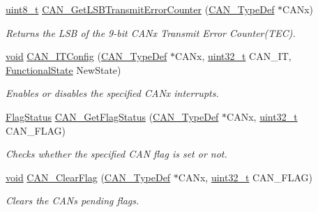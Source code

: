 \begin{DoxyCompactItemize}
\hyperlink{_p_e___types_8h_aba7bc1797add20fe3efdf37ced1182c5}{uint8\+\_\+t} \hyperlink{group___c_a_n___private___functions_ga85ee0c35bf7ca15d4e4c862eef534843}{C\+A\+N\+\_\+\+Get\+L\+S\+B\+Transmit\+Error\+Counter} (\hyperlink{struct_c_a_n___type_def}{C\+A\+N\+\_\+\+Type\+Def} $\ast$C\+A\+Nx)
\begin{DoxyCompactList}\small\item\em Returns the L\+SB of the 9-\/bit C\+A\+Nx Transmit Error Counter(\+T\+E\+C). \end{DoxyCompactList}\item 
\hyperlink{usb__devapi_8h_afabf60e7f57651d6d595a02c75f07cd0}{void} \hyperlink{group___c_a_n___private___functions_gad1a8b2499a780b5bfa4accb3597b02f4}{C\+A\+N\+\_\+\+I\+T\+Config} (\hyperlink{struct_c_a_n___type_def}{C\+A\+N\+\_\+\+Type\+Def} $\ast$C\+A\+Nx, \hyperlink{_p_e___types_8h_a33594304e786b158f3fb30289278f5af}{uint32\+\_\+t} C\+A\+N\+\_\+\+IT, \hyperlink{agilefox_2library_2inc_2stm32f10x__type_8h_ac9a7e9a35d2513ec15c3b537aaa4fba1}{Functional\+State} New\+State)
\begin{DoxyCompactList}\small\item\em Enables or disables the specified C\+A\+Nx interrupts. \end{DoxyCompactList}\item 
\hyperlink{agilefox_2library_2inc_2stm32f10x__type_8h_a89136caac2e14c55151f527ac02daaff}{Flag\+Status} \hyperlink{group___c_a_n___private___functions_ga2faad96caf823ef463cc5b5b25c480bb}{C\+A\+N\+\_\+\+Get\+Flag\+Status} (\hyperlink{struct_c_a_n___type_def}{C\+A\+N\+\_\+\+Type\+Def} $\ast$C\+A\+Nx, \hyperlink{_p_e___types_8h_a33594304e786b158f3fb30289278f5af}{uint32\+\_\+t} C\+A\+N\+\_\+\+F\+L\+AG)
\begin{DoxyCompactList}\small\item\em Checks whether the specified C\+AN flag is set or not. \end{DoxyCompactList}\item 
\hyperlink{usb__devapi_8h_afabf60e7f57651d6d595a02c75f07cd0}{void} \hyperlink{group___c_a_n___private___functions_ga2c01646d5d3a2d7045e8dd71f58f8742}{C\+A\+N\+\_\+\+Clear\+Flag} (\hyperlink{struct_c_a_n___type_def}{C\+A\+N\+\_\+\+Type\+Def} $\ast$C\+A\+Nx, \hyperlink{_p_e___types_8h_a33594304e786b158f3fb30289278f5af}{uint32\+\_\+t} C\+A\+N\+\_\+\+F\+L\+AG)
\begin{DoxyCompactList}\small\item\em Clears the C\+AN\textquotesingle{}s pending flags. \end{DoxyCompactList}\item 

\end{DoxyCompactItemize}
